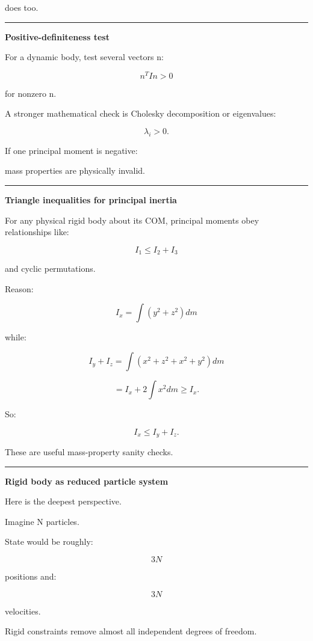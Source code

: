 does too.

\begin{center}\rule{0.5\linewidth}{0.5pt}\end{center}

\textbf{Positive-definiteness test}

For a dynamic body, test several vectors n:

\[
n^TIn>0
\]

for nonzero n.

A stronger mathematical check is Cholesky decomposition or eigenvalues:

\[
\lambda_i>0.
\]

If one principal moment is negative:

mass properties are physically invalid.

\begin{center}\rule{0.5\linewidth}{0.5pt}\end{center}

\textbf{Triangle inequalities for principal inertia}

For any physical rigid body about its COM, principal moments obey relationships like:

\[
I_1\le I_2+I_3
\]

and cyclic permutations.

Reason:

\[
I_x=\int(y^2+z^2)dm
\]

while:

\[
I_y+I_z
=
\int(x^2+z^2+x^2+y^2)dm
\]

\[
=
I_x+
2\int x^2dm
\ge I_x.
\]

So:

\[
\boxed{
I_x\le I_y+I_z.
}
\]

These are useful mass-property sanity checks.

\begin{center}\rule{0.5\linewidth}{0.5pt}\end{center}

\textbf{Rigid body as reduced particle system}

Here is the deepest perspective.

Imagine N particles.

State would be roughly:

\[
3N
\]

positions and:

\[
3N
\]

velocities.

Rigid constraints remove almost all independent degrees of freedom.

